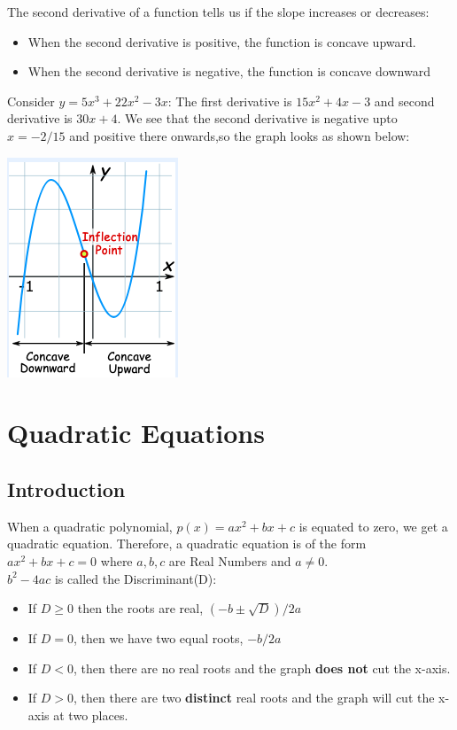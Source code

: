 \documentclass{book}
\begin{document}
	The second derivative of a function tells us if the slope increases or decreases:
	
	\begin{itemize}
		\item When the second derivative is positive, the function is concave upward.
		\item When the second derivative is negative, the function is concave downward
	\end{itemize}
	
	Consider $y = 5x^3 + 22x^2 -3x$:
	The first derivative is $15x^2 + 4x -3$ and second derivative is $30x+ 4$. We see that the second derivative is negative upto $x=-2/15$ and positive there onwards,so the graph looks as shown below:
	
	\includegraphics[scale=0.9]{inflection2}
	
	
	\chapter{Quadratic Equations}
	
	\section{Introduction}
	When a quadratic polynomial, $p(x) = ax^2 + bx + c$ is equated to zero, we get a quadratic equation. Therefore, a quadratic equation is of the form $ax^2 + bx + c = 0$ where $a,b,c$ are Real Numbers and $a \neq 0$. \\
	$b^2 -4ac$ is called the Discriminant(D):
	\begin{itemize}
		\item If $D \ge 0$ then the roots are real, ${(-b \pm \sqrt{D})}/2a$
		\item If $D=0$, then we have two equal roots, $-b/2a$
		\item If $D<0$, then there are no real roots and the graph \textbf{does not} cut the x-axis.
		\item If $D>0$, then there are two \textbf{distinct} real roots and the graph will cut the x-axis at two places.
	\end{itemize}
	
\end{document}
